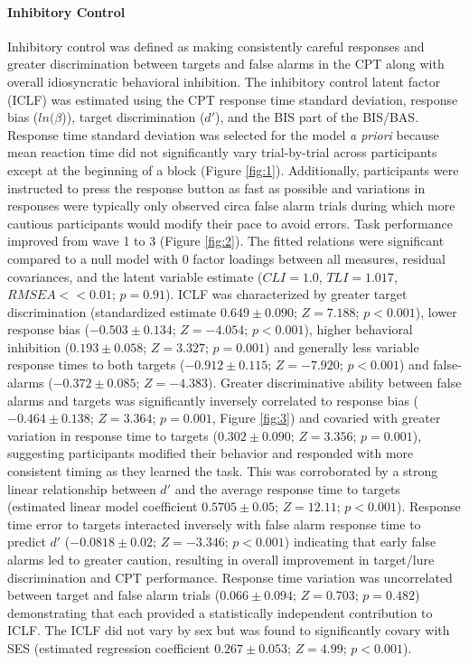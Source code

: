 \documentclass[utf8]{frontiersSCNS} %
\begin{document}
\paragraph{Inhibitory Control} Inhibitory control was defined as  making consistently careful responses and greater discrimination between targets and false alarms in the CPT along with overall idiosyncratic behavioral inhibition. The inhibitory control latent factor (ICLF) was estimated using the CPT response time standard deviation, response bias ($ln(\beta$)), target discrimination ($d'$), and the BIS part of the BIS/BAS. Response time standard deviation was selected for the model \textit{\textit{a priori}} because mean reaction time did not significantly vary trial-by-trial across participants except at the beginning of a block (Figure \ref{fig:1}). Additionally, participants were instructed to press the response button as fast as possible and variations in responses were typically only observed circa false alarm trials during which more cautious participants would modify their pace to avoid errors. Task performance improved from wave 1 to 3 (Figure \ref{fig:2}). The fitted relations were significant compared to a null model with 0 factor loadings between all measures, residual covariances, and the latent variable estimate ($CLI = 1.0$, $TLI = 1.017$, $RMSEA << 0.01$; $p = 0.91$). ICLF was characterized by greater target discrimination (standardized estimate $0.649\pm0.090$; $Z = 7.188$; $p<0.001$), lower response bias ($-0.503\pm0.134$; $Z=-4.054$; $p<0.001$), higher behavioral inhibition ($0.193\pm0.058$; $Z=3.327$; $p=0.001$) and generally less variable response times to both targets ($-0.912\pm0.115$; $Z=-7.920$; $p<0.001$) and false-alarms ($-0.372\pm0.085$; $Z=-4.383$). Greater discriminative ability between false alarms and targets was significantly inversely correlated to response bias ($-0.464\pm0.138$; $Z=3.364$; $p=0.001$, Figure \ref{fig:3}) and covaried with greater variation in response time to targets ($0.302\pm0.090$; $Z=3.356$; $p=0.001$), suggesting participants modified their behavior and responded with more consistent timing as they learned the task. This was corroborated by a strong linear relationship between $d'$ and the average response time to targets (estimated linear model coefficient $0.5705\pm0.05$; $Z=12.11$; $p<0.001$). Response time error to targets interacted inversely with false alarm response time to predict $d'$ ($-0.0818\pm0.02$;  $Z=-3.346$; $p < 0.001$) indicating that early false alarms led to greater caution, resulting in overall improvement in target/lure discrimination and CPT performance. Response time variation was uncorrelated between target and false alarm trials ($0.066\pm0.094$; $Z=0.703$; $p=0.482$) demonstrating that each provided a statistically independent contribution to ICLF. The ICLF did not vary by sex but was found to significantly covary with SES (estimated regression coefficient $0.267\pm0.053$; $Z=4.99$; $p<0.001$). 
\end{document}
